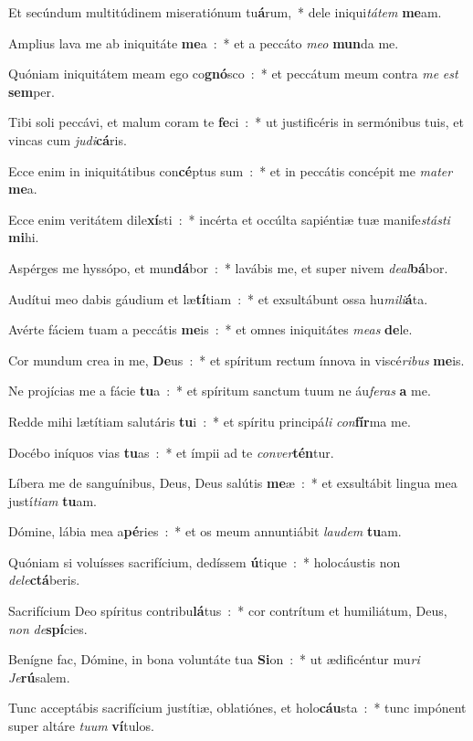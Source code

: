 ﻿\item Et secúndum multitúdinem miseratiónum tu\textbf{á}rum,~* dele iniqui\emph{tá}\emph{tem} \textbf{me}am.
\item Amplius lava me ab iniquitáte \textbf{me}a~:~* et a peccáto \emph{me}\emph{o} \textbf{mun}da me.
\item Quóniam iniquitátem meam ego co\textbf{gnó}sco~:~* et peccátum meum contra \emph{me} \emph{est} \textbf{sem}per.
\item Tibi soli peccávi, et malum coram te \textbf{fe}ci~:~* ut justificéris in sermónibus tuis, et vincas cum \emph{ju}\emph{di}\textbf{cá}ris.
\item Ecce enim in iniquitátibus con\textbf{cé}ptus sum~:~* et in peccátis concépit me \emph{ma}\emph{ter} \textbf{me}a.
\item Ecce enim veritátem dile\textbf{xí}sti~:~* incérta et occúlta sapiéntiæ tuæ manife\emph{stá}\emph{sti} \textbf{mi}hi.
\item Aspérges me hyssópo, et mun\textbf{dá}bor~:~* lavábis me, et super nivem \emph{de}\emph{al}\textbf{bá}bor.
\item Audítui meo dabis gáudium et læ\textbf{tí}tiam~:~* et exsultábunt ossa hu\emph{mi}\emph{li}\textbf{á}ta.
\item Avérte fáciem tuam a peccátis \textbf{me}is~:~* et omnes iniquitátes \emph{me}\emph{as} \textbf{de}le.
\item Cor mundum crea in me, \textbf{De}us~:~* et spíritum rectum ínnova in viscé\emph{ri}\emph{bus} \textbf{me}is.
\item Ne projícias me a fácie \textbf{tu}a~:~* et spíritum sanctum tuum ne áu\emph{fe}\emph{ras} \textbf{a} me.
\item Redde mihi lætítiam salutáris \textbf{tu}i~:~* et spíritu principá\emph{li} \emph{con}\textbf{fír}ma me.
\item Docébo iníquos vias \textbf{tu}as~:~* et ímpii ad te \emph{con}\emph{ver}\textbf{tén}tur.
\item Líbera me de sanguínibus, Deus, Deus salútis \textbf{me}æ~:~* et exsultábit lingua mea justí\emph{ti}\emph{am} \textbf{tu}am.
\item Dómine, lábia mea a\textbf{pé}ries~:~* et os meum annuntiábit \emph{lau}\emph{dem} \textbf{tu}am.
\item Quóniam si voluísses sacrifícium, dedíssem \textbf{ú}tique~:~* holocáustis non \emph{de}\emph{le}\textbf{ctá}beris.
\item Sacrifícium Deo spíritus contribu\textbf{lá}tus~:~* cor contrítum et humiliátum, Deus, \emph{non} \emph{de}\textbf{spí}cies.
\item Benígne fac, Dómine, in bona voluntáte tua \textbf{Si}on~:~* ut ædificéntur mu\emph{ri} \emph{Je}\textbf{rú}salem.
\item Tunc acceptábis sacrifícium justítiæ, oblatiónes, et holo\textbf{cáu}sta~:~* tunc impónent super altáre \emph{tu}\emph{um} \textbf{ví}tulos.